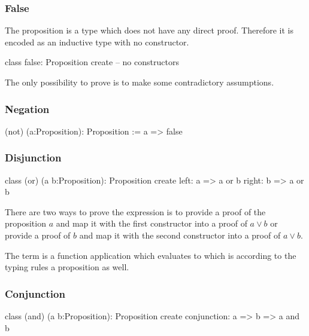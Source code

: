 \subsubsection{False}

The proposition  is a type which does not have any direct
proof. Therefore it is encoded as an inductive type with no constructor.
%
\begin{alba}
  class
    false: Proposition
  create
    -- no constructors
\end{alba}

The only possibility to prove  is to make some contradictory
assumptions. \vskip 2mm




\subsubsection{Negation}
%
\begin{alba}
  (not) (a:Proposition): Proposition
    := a => false
\end{alba}
\vskip 2mm






\subsubsection{Disjunction}
%
\begin{alba}
  class
    (or) (a b:Proposition): Proposition
  create
    left:  a => a or b
    right: b => a or b
\end{alba}

There are two ways to prove the expression  is to provide a proof
of the proposition $a$ and map it with the first constructor into a proof of
$a \lor b$ or provide a proof of $b$ and map it with the second constructor
into a proof of $a \lor b$.

The term  is a function application which evaluates to
 which is according to the typing rules a proposition
as well.
\newline




\subsubsection{Conjunction}
%
\begin{alba}
  class
    (and) (a b:Proposition): Proposition
  create
    conjunction: a => b => a and b
\end{alba}


